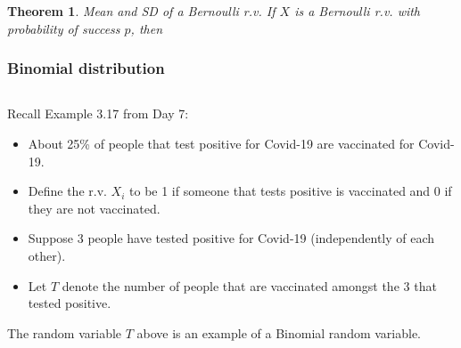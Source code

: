 \documentclass[12pt]{amsart}
\newtheorem{theorem}{Theorem}[section]
\begin{document}
{\begin{itemize}

\vspace{1.5cm}
\end{itemize}




\begin{theorem}{Mean and SD of a Bernoulli r.v.} \newline
If $X$ is a Bernoulli r.v. with probability of success $p$, then 



\end{theorem}




\newpage
\subsubsection{Binomial distribution}  $ \ $



\vspace{0.5cm}
Recall Example 3.17 from Day 7:
\begin{itemize}
\item About 25\% of people that test positive for Covid-19 are vaccinated for Covid-19.
\item Define the r.v. $X_i$ to be 1 if someone that tests positive is vaccinated and 0 if they are not vaccinated. 
\item Suppose 3 people have tested positive for Covid-19 (independently of each other). 
\item Let $T$ denote the number of people that are vaccinated amongst the 3 that tested positive.
\end{itemize}

\vspace{0.5cm}
The random variable $T$ above is an example of a Binomial random variable. \newline

}
\end{document}
